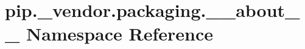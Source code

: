 \hypertarget{namespacepip_1_1__vendor_1_1packaging_1_1____about____}{}\section{pip.\+\_\+vendor.\+packaging.\+\_\+\+\_\+about\+\_\+\+\_\+ Namespace Reference}
\label{namespacepip_1_1__vendor_1_1packaging_1_1____about____}
